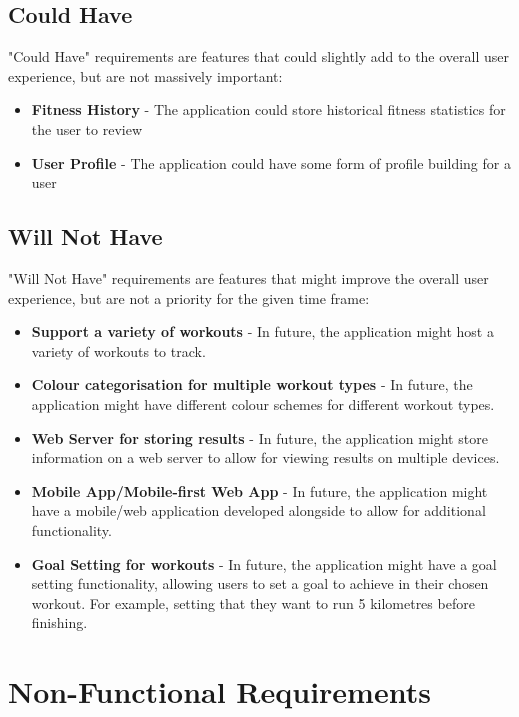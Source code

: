 \documentclass{l4proj}
\begin{document}
\subsection{Could Have}
\label{sec:couldhave}

"Could Have" requirements are features that could slightly add to the overall user experience, but are not massively important:

\begin{itemize}
    \item \textbf{Fitness History} - The application could store historical fitness statistics for the user to review
    \item \textbf{User Profile} - The application could have some form of profile building for a user
\end{itemize}

\subsection{Will Not Have}
\label{sec:willnothave}

"Will Not Have" requirements are features that might improve the overall user experience, but are not a priority for the given time frame:

\begin{itemize}
    \item \textbf{Support a variety of workouts} - In future, the application might host a variety of workouts to track.
    \item \textbf{Colour categorisation for multiple workout types} - In future, the application might have different colour schemes for different workout types.
    \item \textbf{Web Server for storing results} - In future, the application might store information on a web server to allow for viewing results on multiple devices.
    \item \textbf{Mobile App/Mobile-first Web App} - In future, the application might have a mobile/web application developed alongside to allow for additional functionality.
    \item \textbf{Goal Setting for workouts} - In future, the application might have a goal setting functionality, allowing users to set a goal to achieve in their chosen workout. For example, setting that they want to run 5 kilometres before finishing.
\end{itemize}

\section{Non-Functional Requirements}
\label{sec:nonfunctionalreqs}
\end{document}
